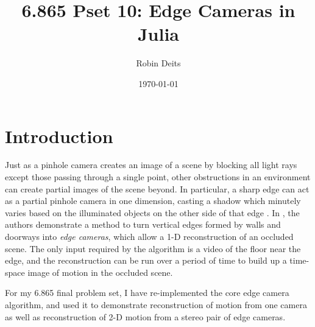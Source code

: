 \documentclass{article}
\title{6.865 Pset 10: Edge Cameras in Julia}
\author{Robin Deits}
\date{\today}
\begin{document}
\maketitle

\section{Introduction}

Just as a pinhole camera creates an image of a scene by blocking all light rays except those passing through a single point, other obstructions in an environment can create partial images of the scene beyond. In particular, a sharp edge can act as a partial pinhole camera in one dimension, casting a shadow which minutely varies based on the illuminated objects on the other side of that edge \cite{notfound}. In \cite{notfound}, the authors demonstrate a method to turn vertical edges formed by walls and doorways into \emph{edge cameras}, which allow a 1-D reconstruction of an occluded scene. The only input required by the algorithm is a video of the floor near the edge, and the reconstruction can be run over a period of time to build up a time-space image of motion in the occluded scene. 

For my 6.865 final problem set, I have re-implemented the core edge camera algorithm, and used it to demonstrate reconstruction of motion from one camera as well as reconstruction of 2-D motion from a stereo pair of edge cameras. 
\end{document}
